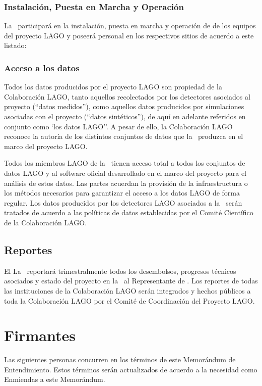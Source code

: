 \subsubsection{Instalación, Puesta en Marcha y Operación}

La \institution\ participará en la instalación, puesta en marcha y
operación de de los equipos del proyecto LAGO y poseerá personal en los
respectivos sitios de acuerdo a este listado:



\subsubsection{Acceso a los datos}\label{data}

Todos los datos producidos por el proyecto LAGO son propiedad de la
Colaboración LAGO, tanto aquellos recolectados por los detectores asociados al
proyecto (``datos medidos''), como aquellos datos producidos por simulaciones
asociadas con el proyecto (``datos sintéticos''), de aquí en adelante referidos
en conjunto como `los datos LAGO''. A pesar de ello, la Colaboración LAGO
reconoce la autoría de los distintos conjuntos de datos que la
\institution~produzca en el marco del proyecto LAGO.

Todos los miembros LAGO de la \institution~tienen acceso total a todos los
conjuntos de datos LAGO y al software oficial desarrollado en el marco del
proyecto para el análisis de estos datos. Las partes acuerdan la provisión de
la infraestructura o los métodos necesarios para garantizar el acceso a los
datos LAGO de forma regular. Los datos producidos por los detectores LAGO
asociados a la \institution~serán tratados de acuerdo a las políticas de datos
establecidas por el Comité Científico de la Colaboración LAGO.

\subsection{Reportes}

\ifirg El \else La \fi \instrep~reportará trimestralmente todos los
desembolsos, progresos técnicos asociados y estado del proyecto en la
\institution~al Representante de \country. Los reportes de todas las
instituciones de la Colaboración LAGO serán integrados y hechos públicos a toda
la Colaboración LAGO por el Comité de Coordinación del Proyecto LAGO.

\section{Firmantes}

Las siguientes personas concurren en los términos de este Memorándum de
Entendimiento. Estos términos serán actualizados de acuerdo a la necesidad como
Enmiendas a este Memorándum.


